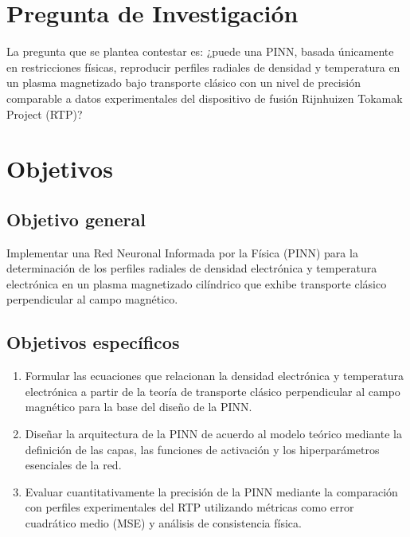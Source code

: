 \section{Pregunta de Investigación}

La pregunta que se plantea contestar es: ¿puede una
PINN, basada únicamente en restricciones físicas, reproducir perfiles radiales de densidad y temperatura en un plasma magnetizado bajo transporte clásico con un nivel
de precisión comparable a datos experimentales del dispositivo de fusión Rijnhuizen Tokamak Project (RTP)?

\section{Objetivos}

\subsection*{Objetivo general}
Implementar una Red Neuronal Informada por la Física (PINN) para la determinación de los perfiles radiales de densidad electrónica y temperatura electrónica en un plasma magnetizado cilíndrico que exhibe transporte clásico perpendicular al campo magnético.

\subsection*{Objetivos específicos}

	\begin{enumerate}
		\item Formular las ecuaciones que relacionan la densidad electrónica y temperatura electrónica a partir de la teoría de transporte clásico perpendicular al campo magnético para la base del diseño de la PINN.
		\item Diseñar la arquitectura de la PINN de acuerdo al modelo teórico mediante la definición de las capas, las funciones de activación y los hiperparámetros esenciales de la red. 
		\item  Evaluar cuantitativamente la precisión de la PINN mediante la comparación con perfiles experimentales del RTP utilizando métricas como error cuadrático medio (MSE) y análisis de consistencia física.
	\end{enumerate}


